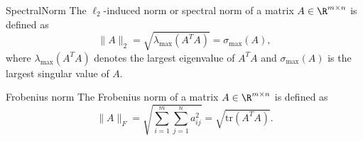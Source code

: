 \begin{ex}{SpectralNorm}
    The $\ell_2$-induced norm or spectral norm of a matrix $A \in \R^{m \times n}$ is defined as
    \begin{equation*}
        \|A\|_2 = \sqrt{\lambda_{\max}(A^T A)} = \sigma_{\max}(A),
    \end{equation*}
    where $\lambda_{\max}(A^T A)$ denotes the largest eigenvalue of $A^T A$ and $\sigma_{\max}(A)$ is the largest singular value of $A$.
\end{ex}

\begin{ex}{Frobenius norm}
    The Frobenius norm of a matrix $A \in \R^{m \times n}$ is defined as
    \begin{equation*}
        \|A\|_F = \sqrt{\sum_{i=1}^m \sum_{j=1}^n a_{ij}^2} = \sqrt{\text{tr}(A^T A)}.
    \end{equation*}
    \vspace{-0.5cm}
\end{ex}

